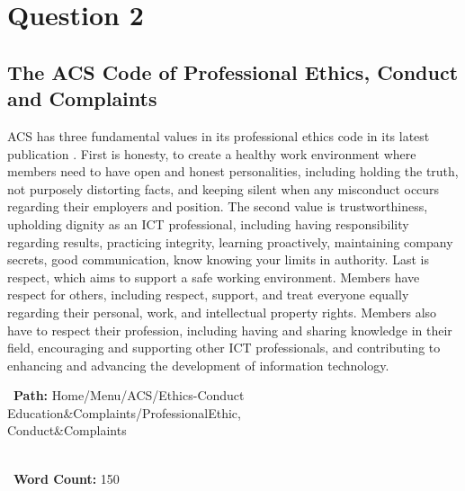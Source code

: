 \documentclass[12pt,a4paper]{article}
\begin{document}
\setcounter{page}{3}

\section{Question 2}
\subsection{The ACS Code of Professional Ethics, Conduct and Complaints}
\label{sec:Question 2}

ACS has three fundamental values in its professional ethics code in its latest publication \citep{question_2.1}. First is honesty, to create a healthy work environment where members need to have open and honest personalities, including holding the truth, not purposely distorting facts, and keeping silent when any misconduct occurs regarding their employers and position. The second value is trustworthiness, upholding dignity as an ICT professional, including having responsibility regarding results, practicing integrity, learning proactively, maintaining company secrets, good communication, know knowing your limits in authority. Last is respect, which aims to support a safe working environment. Members have respect for others, including respect, support, and treat everyone equally regarding their personal, work, and intellectual property rights. Members also have to respect their profession, including having and sharing knowledge in their field, encouraging and supporting other ICT professionals, and contributing to enhancing and advancing the development of information technology.\\

\noindent\parbox{16.5cm}{
    \textbullet\ \textbf{Path:} Home/Menu/ACS/Ethics-Conduct\textunderscore\,Education\textunderscore\&\textunderscore Complaints/Professional\textunderscore Ethic,\\
     \hspace*{1.35cm}Conduct\textunderscore\&\textunderscore Complaints
} 

\noindent \\ \textbullet\ \textbf{Word Count:} 150

\pagebreak

\end{document}
